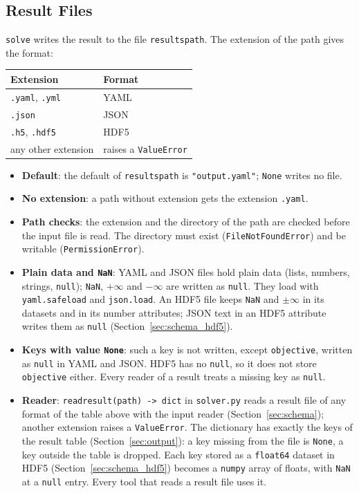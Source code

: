 \documentclass[11pt,a4paper]{article}
\makeatletter
\theoremstyle{plain}
\theoremstyle{definition}
\renewcommand{\_}{\textunderscore\allowbreak{}}
\providecommand{\rejrow}[2]{{\raggedright #1\par} & {\raggedright #2\par} \\}
\providecommand{\tabstart}[2]{\begingroup\small\begin{longtable}{@{}#1@{}}\toprule #2 \\ \midrule \endhead}
\providecommand{\tabend}{\bottomrule\end{longtable}\endgroup}
\makeatother
\begin{document}
\subsection{Result Files}\label{sec:output_files}

\texttt{solve} writes the result to the file \texttt{results\_path}. The extension of the path gives the format:

\tabstart{p{4.3cm}p{4.3cm}}{Extension & Format}
\rejrow{\texttt{.yaml}, \texttt{.yml}}{YAML}
\rejrow{\texttt{.json}}{JSON}
\rejrow{\texttt{.h5}, \texttt{.hdf5}}{HDF5}
\rejrow{any other extension}{raises a \texttt{ValueError}}
\tabend

\begin{itemize}[nosep,leftmargin=1.5em]
  \item \textbf{Default}: the default of \texttt{results\_path} is \texttt{"output.yaml"}; \texttt{None} writes no file.
  \item \textbf{No extension}: a path without extension gets the extension \texttt{.yaml}.
  \item \textbf{Path checks}: the extension and the directory of the path are checked before the input file is read. The directory must exist (\texttt{FileNotFoundError}) and be writable (\texttt{PermissionError}).
  \item \textbf{Plain data and \texttt{NaN}}: YAML and JSON files hold plain data (lists, numbers, strings, \texttt{null}); \texttt{NaN}, $+\infty$ and $-\infty$ are written as \texttt{null}. They load with \texttt{yaml.safe\_load} and \texttt{json.load}. An HDF5 file keeps \texttt{NaN} and $\pm\infty$ in its datasets and in its number attributes; JSON text in an HDF5 attribute writes them as \texttt{null} (Section~\ref{sec:schema_hdf5}).
  \item \textbf{Keys with value \texttt{None}}: such a key is not written, except \texttt{objective}, written as \texttt{null} in YAML and JSON. HDF5 has no \texttt{null}, so it does not store \texttt{objective} either. Every reader of a result treats a missing key as \texttt{null}.
  \item \textbf{Reader}: \texttt{read\_result(path) -> dict} in \texttt{solver.py} reads a result file of any format of the table above with the input reader (Section~\ref{sec:schema}); another extension raises a \texttt{ValueError}. The dictionary has exactly the keys of the result table (Section~\ref{sec:output}): a key missing from the file is \texttt{None}, a key outside the table is dropped. Each key stored as a \texttt{float64} dataset in HDF5 (Section~\ref{sec:schema_hdf5}) becomes a \texttt{numpy} array of floats, with \texttt{NaN} at a \texttt{null} entry. Every tool that reads a result file uses it.
\end{itemize}
\end{document}
